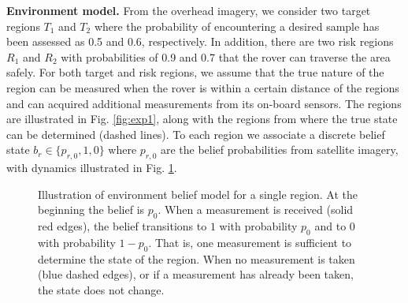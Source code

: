 \documentclass{ifacconf}
\begin{document}
\textbf{Environment model.} From the overhead imagery, we consider two %
 target regions $T_1$ and $T_2$ where the probability of encountering a desired sample has been assessed as 0.5 and 0.6, respectively. In addition, there are two risk regions $R_1$ and $R_2$ with probabilities of 0.9 and 0.7 that the rover can traverse the area safely. For both target and risk regions, we assume that the true nature of the region can be measured when the rover is within a certain distance of the regions and can acquired additional measurements from its on-board sensors. The regions are illustrated in Fig. \ref{fig:exp1}, along with the regions from where the true state can be determined (dashed lines). To each region we associate a discrete belief state $b_r \in \{ p_{r,0}, 1, 0 \}$ where $p_{r,0}$ are the belief probabilities from satellite imagery, with dynamics illustrated in Fig. \ref{fig:envmdp}.

\begin{figure}
  \begin{center}
  \end{center}
  \caption{Illustration of environment belief model for a single region. At the beginning the belief is $p_0$. When a measurement is received (solid red edges), the belief transitions to $1$ with probability $p_0$ and to $0$ with probability $1-p_0$. That is, one measurement is sufficient to determine the state of the region. When no measurement is taken (blue dashed edges), or if a measurement has already been taken, the state does not change.}
  \label{fig:envmdp}
\end{figure}
\end{document}
